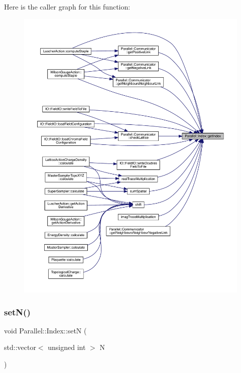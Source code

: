 Here is the caller graph for this function\+:
\nopagebreak
\begin{figure}[H]
\begin{center}
\leavevmode
\includegraphics[width=350pt]{class_parallel_1_1_index_af31faeef1369fdc0997d1910e008bfe2_icgraph}
\end{center}
\end{figure}
\mbox{\label{class_parallel_1_1_index_ab8650936d7000d54b811dd128618f9ad}} 
\subsubsection{\texorpdfstring{setN()}{setN()}}
{\footnotesize\ttfamily void Parallel\+::\+Index\+::setN (\begin{DoxyParamCaption}\item[{std\+::vector$<$ unsigned int $>$}]{N }\end{DoxyParamCaption})\hspace{0.3cm}{\ttfamily [static]}}

